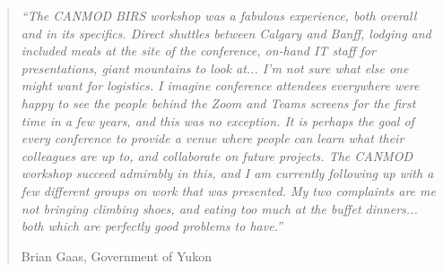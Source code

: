 \begin{quote}
{\it ``The CANMOD BIRS workshop was a fabulous experience, both overall and in its specifics. Direct shuttles between Calgary and Banff, lodging and included meals at the site of the conference, on-hand IT staff for presentations, giant mountains to look at... I'm not sure what else one might want for logistics. I imagine conference attendees everywhere were happy to see the people behind the Zoom and Teams screens for the first time in a few years, and this was no exception. It is perhaps the goal of every conference to provide a venue where people can learn what their colleagues are up to, and collaborate on future projects. The CANMOD workshop succeed admirably in this, and I am currently following up with a few different groups on work that was presented. My two complaints are me not bringing climbing shoes, and eating too much at the buffet dinners... both which are perfectly good problems to have.''}

\hfill Brian Gaas, Government of Yukon
\end{quote}